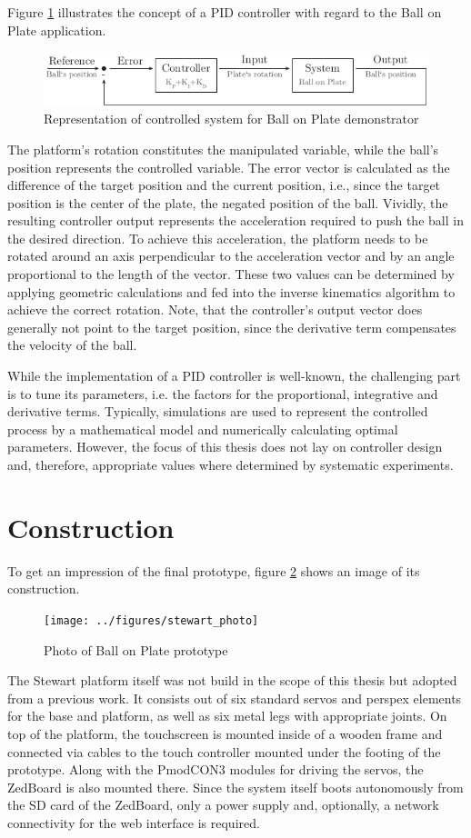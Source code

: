 Figure \ref{fig:pid_rep} illustrates the concept of a \ac{PID} controller with
regard to the Ball on Plate application.
\begin{figure}
	\centering
	\centering
	\includegraphics{../figures/pid_rep}
	\caption{Representation of controlled system for Ball on Plate demonstrator}
	\label{fig:pid_rep}
\end{figure}
The platform's rotation constitutes the manipulated variable, while the ball's
position represents the controlled variable. The error vector is calculated as
the difference of the target position and the current position, i.e., since
the target position is the center of the plate, the negated position of the
ball. Vividly, the resulting controller output represents the acceleration
required to push the ball in the desired direction. To achieve this
acceleration, the platform needs to be rotated around an axis perpendicular to
the acceleration vector and by an angle proportional to the length of the
vector. These two values can be determined by applying geometric calculations
and fed into the inverse kinematics algorithm to achieve the correct rotation.
Note, that the controller's output vector does generally not point to the
target position, since the derivative term compensates the velocity of the
ball.

While the implementation of a \ac{PID} controller is well-known, the
challenging part is to tune its parameters, i.e. the factors for the
proportional, integrative and derivative terms. Typically, simulations are
used to represent the controlled process by a mathematical model and
numerically calculating optimal parameters. However, the focus of this thesis
does not lay on controller design and, therefore, appropriate values where
determined by systematic experiments.

\section{Construction}
To get an impression of the final prototype, figure \ref{fig:stewart_photo}
shows an image of its construction.
\begin{figure}
	\centering
	\texttt{[image: ../figures/stewart\_photo]}
	\caption{Photo of Ball on Plate prototype}
	\label{fig:stewart_photo}
\end{figure}
The Stewart platform itself was not build in the scope of this thesis but
adopted from a previous work. It consists out of six standard servos and
perspex elements for the base and platform, as well as six metal legs with
appropriate joints. On top of the platform, the touchscreen is mounted inside
of a wooden frame and connected via cables to the touch controller mounted
under the footing of the prototype. Along with the PmodCON3 modules for
driving the servos, the ZedBoard is also mounted there. Since the system
itself boots autonomously from the SD card of the ZedBoard, only a power
supply and, optionally, a network connectivity for the web interface is required.

